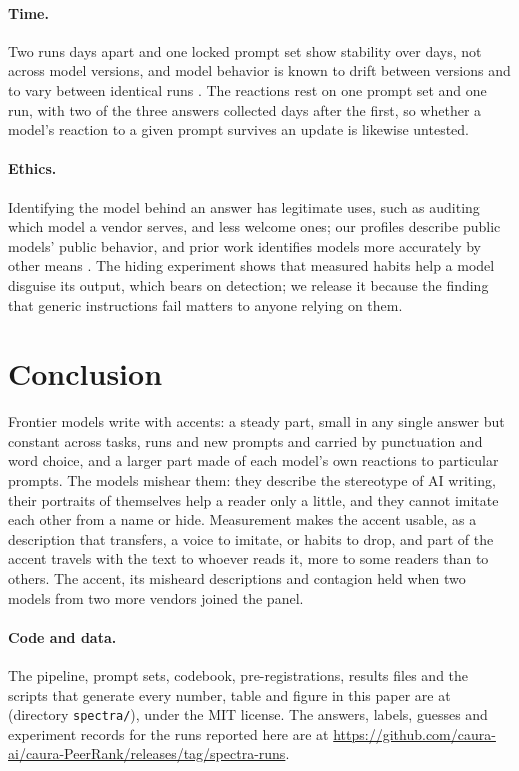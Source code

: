 \documentclass[11pt]{article}
\newcommand{\dataLink}{\url{https://github.com/caura-ai/caura-PeerRank/releases/tag/spectra-runs}}
\begin{document}
\paragraph{Time.} Two runs \daysApart{} days apart and one locked prompt set show stability over days, not across model versions, and model behavior is known to drift between versions \citep{chen2024behaviorchange} and to vary between identical runs \citep{atil2024stability}. The reactions rest on one prompt set and one run, with two of the three answers collected \repDaysLater{} days after the first, so whether a model's reaction to a given prompt survives an update is likewise untested.
\paragraph{Ethics.} Identifying the model behind an answer has legitimate uses, such as auditing which model a vendor serves, and less welcome ones; our profiles describe public models' public behavior, and prior work identifies models more accurately by other means \citep{sun2025idiosyncrasies,pasquini2025llmmap}. The hiding experiment shows that measured habits help a model disguise its output, which bears on detection; we release it because the finding that generic instructions fail matters to anyone relying on them.

\section{Conclusion}
Frontier models write with accents: a steady part, small in any single answer but constant across tasks, runs and new prompts and carried by punctuation and word choice, and a larger part made of each model's own reactions to particular prompts.
The models mishear them: they describe the stereotype of AI writing, their portraits of themselves help a reader only a little, and they cannot imitate each other from a name or hide.
Measurement makes the accent usable, as a description that transfers, a voice to imitate, or habits to drop, and part of the accent travels with the text to whoever reads it, more to some readers than to others.
The accent, its misheard descriptions and contagion held when two models from two more vendors joined the panel.

\paragraph{Code and data.} The pipeline, prompt sets, codebook, pre-registrations, results files and the scripts that generate every number, table and figure in this paper are at \repoLink{} (directory \texttt{spectra/}), under the MIT license. The answers, labels, guesses and experiment records for the runs reported here are at \dataLink.
\end{document}
